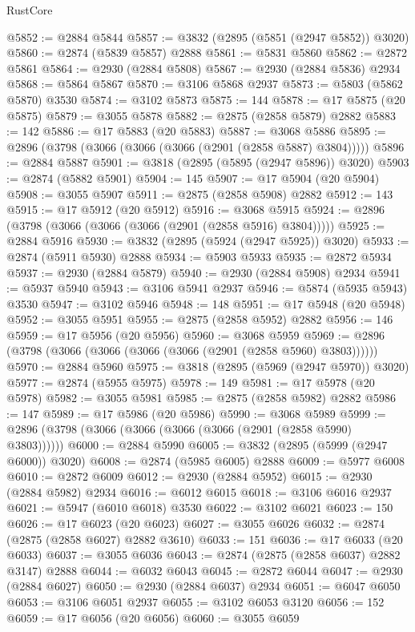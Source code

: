 \begin{lexlean}{RustCore}
\begin{coremodule}
@5852 := @2884 @5844
@5857 := @3832 (@2895 (@5851 (@2947 @5852)) @3020)
@5860 := @2874 (@5839 @5857) @2888
@5861 := @5831 @5860
@5862 := @2872 @5861
@5864 := @2930 (@2884 @5808)
@5867 := @2930 (@2884 @5836) @2934
@5868 := @5864 @5867
@5870 := @3106 @5868 @2937
@5873 := @5803 (@5862 @5870) @3530
@5874 := @3102 @5873
@5875 := 144
@5878 := @17 @5875 (@20 @5875)
@5879 := @3055 @5878
@5882 := @2875 (@2858 @5879) @2882
@5883 := 142
@5886 := @17 @5883 (@20 @5883)
@5887 := @3068 @5886
@5895 := @2896 (@3798 (@3066 (@3066 (@3066 (@2901 (@2858 @5887) @3804)))))
@5896 := @2884 @5887
@5901 := @3818 (@2895 (@5895 (@2947 @5896)) @3020)
@5903 := @2874 (@5882 @5901)
@5904 := 145
@5907 := @17 @5904 (@20 @5904)
@5908 := @3055 @5907
@5911 := @2875 (@2858 @5908) @2882
@5912 := 143
@5915 := @17 @5912 (@20 @5912)
@5916 := @3068 @5915
@5924 := @2896 (@3798 (@3066 (@3066 (@3066 (@2901 (@2858 @5916) @3804)))))
@5925 := @2884 @5916
@5930 := @3832 (@2895 (@5924 (@2947 @5925)) @3020)
@5933 := @2874 (@5911 @5930) @2888
@5934 := @5903 @5933
@5935 := @2872 @5934
@5937 := @2930 (@2884 @5879)
@5940 := @2930 (@2884 @5908) @2934
@5941 := @5937 @5940
@5943 := @3106 @5941 @2937
@5946 := @5874 (@5935 @5943) @3530
@5947 := @3102 @5946
@5948 := 148
@5951 := @17 @5948 (@20 @5948)
@5952 := @3055 @5951
@5955 := @2875 (@2858 @5952) @2882
@5956 := 146
@5959 := @17 @5956 (@20 @5956)
@5960 := @3068 @5959
@5969 := @2896 (@3798 (@3066 (@3066 (@3066 (@3066 (@2901 (@2858 @5960) @3803))))))
@5970 := @2884 @5960
@5975 := @3818 (@2895 (@5969 (@2947 @5970)) @3020)
@5977 := @2874 (@5955 @5975)
@5978 := 149
@5981 := @17 @5978 (@20 @5978)
@5982 := @3055 @5981
@5985 := @2875 (@2858 @5982) @2882
@5986 := 147
@5989 := @17 @5986 (@20 @5986)
@5990 := @3068 @5989
@5999 := @2896 (@3798 (@3066 (@3066 (@3066 (@3066 (@2901 (@2858 @5990) @3803))))))
@6000 := @2884 @5990
@6005 := @3832 (@2895 (@5999 (@2947 @6000)) @3020)
@6008 := @2874 (@5985 @6005) @2888
@6009 := @5977 @6008
@6010 := @2872 @6009
@6012 := @2930 (@2884 @5952)
@6015 := @2930 (@2884 @5982) @2934
@6016 := @6012 @6015
@6018 := @3106 @6016 @2937
@6021 := @5947 (@6010 @6018) @3530
@6022 := @3102 @6021
@6023 := 150
@6026 := @17 @6023 (@20 @6023)
@6027 := @3055 @6026
@6032 := @2874 (@2875 (@2858 @6027) @2882 @3610)
@6033 := 151
@6036 := @17 @6033 (@20 @6033)
@6037 := @3055 @6036
@6043 := @2874 (@2875 (@2858 @6037) @2882 @3147) @2888
@6044 := @6032 @6043
@6045 := @2872 @6044
@6047 := @2930 (@2884 @6027)
@6050 := @2930 (@2884 @6037) @2934
@6051 := @6047 @6050
@6053 := @3106 @6051 @2937
@6055 := @3102 @6053 @3120
@6056 := 152
@6059 := @17 @6056 (@20 @6056)
@6060 := @3055 @6059

\end{coremodule}
\end{lexlean}
